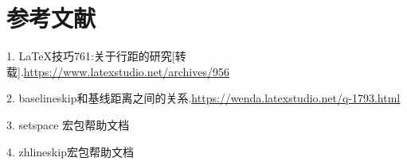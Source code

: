 \documentclass{ctexart}
\makeatletter
\newcommand{\baselinerule}{%
	\leavevmode\rlap{\color{red}\rule{.5\linewidth}{.5pt}}
}
\newcommand{\baselineskiprule}{%
	\leavevmode{\color{teal}\rule[\dimexpr\f@size pt-\baselineskip\relax]{.5pt}{\baselineskip}}%
	\llap{\color{brown}\rule{.5pt}{\f@size pt}}\space}
\newcommand{\cmd}[1]{\texttt{\textbackslash #1}}
\newcommand{\opt}[1]{\textsf{#1}}
\makeatother
\begin{document}
	
	
	
	
	
	
	
	
	
	
	
	
	\section{参考文献}
	1. LaTeX技巧761:关于行距的研究[转载].\url{https://www.latexstudio.net/archives/956}
	
	2. baselineskip和基线距离之间的关系.\url{https://wenda.latexstudio.net/q-1793.html}
	
	3. setspace 宏包帮助文档
	
	4. zhlineskip宏包帮助文档
\end{document}
